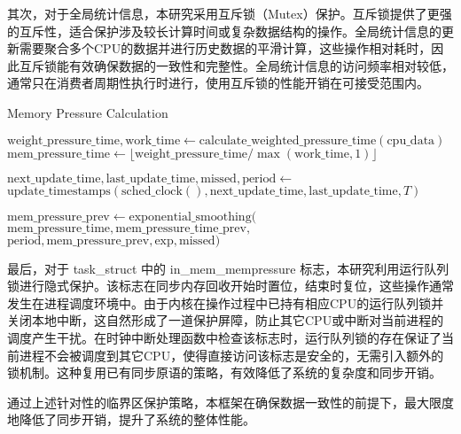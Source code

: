 其次，对于全局统计信息，本研究采用互斥锁（Mutex）保护。互斥锁提供了更强的互斥性，适合保护涉及较长计算时间或复杂数据结构的操作。全局统计信息的更新需要聚合多个CPU的数据并进行历史数据的平滑计算，这些操作相对耗时，因此互斥锁能有效确保数据的一致性和完整性。全局统计信息的访问频率相对较低，通常只在消费者周期性执行时进行，使用互斥锁的性能开销在可接受范围内。
\begin{algorithm}[htbp]
    \caption{Memory Pressure Calculation}
    \label{alg:mem_pressure_optimized}
    \SetAlgoLined
    \DontPrintSemicolon


    \BlankLine

    \(\text{weight\_pressure\_time}, \text{work\_time} \gets \text{calculate\_weighted\_pressure\_time}(\text{cpu\_data})\)\;
    \(\text{mem\_pressure\_time} \gets \lfloor \text{weight\_pressure\_time}/\max(\text{work\_time},1)\rfloor\)\;

    \(\text{next\_update\_time}, \text{last\_update\_time}, \text{missed}, \text{period} \gets\) \(\text{update\_timestamps}(\text{sched\_clock}(), \text{next\_update\_time}, \text{last\_update\_time}, T)\)\;

    \(\text{mem\_pressure\_prev} \gets \text{exponential\_smoothing}(\)
    \qquad \(\text{mem\_pressure\_time}, \text{mem\_pressure\_time\_prev},\)
    \qquad \(\text{period}, \text{mem\_pressure\_prev}, \text{exp}, \text{missed})\)\;
\end{algorithm}
最后，对于 task\_struct 中的 in\_mem\_mempressure 标志，本研究利用运行队列锁进行隐式保护。该标志在同步内存回收开始时置位，结束时复位，这些操作通常发生在进程调度环境中。由于内核在操作过程中已持有相应CPU的运行队列锁并关闭本地中断，这自然形成了一道保护屏障，防止其它CPU或中断对当前进程的调度产生干扰。在时钟中断处理函数中检查该标志时，运行队列锁的存在保证了当前进程不会被调度到其它CPU，使得直接访问该标志是安全的，无需引入额外的锁机制。这种复用已有同步原语的策略，有效降低了系统的复杂度和同步开销。

通过上述针对性的临界区保护策略，本框架在确保数据一致性的前提下，最大限度地降低了同步开销，提升了系统的整体性能。

